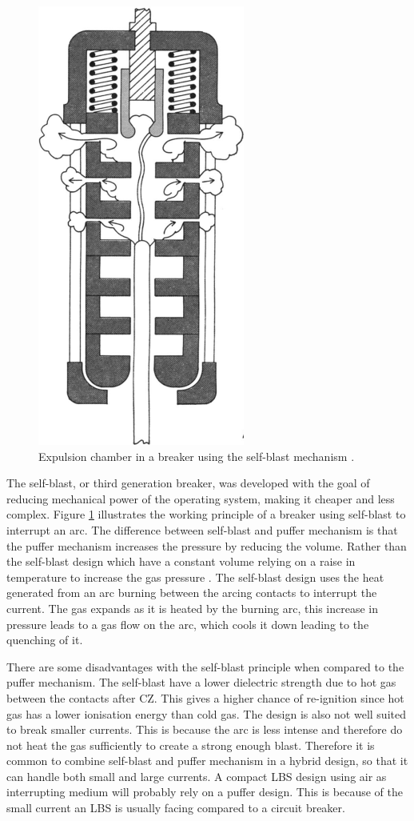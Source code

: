 \documentclass[10pt,a4paper,twoside]{article}
\begin{document}
\begin{figure} [H]
\centering
\includegraphics[scale=0.5]{Bilder/Theory/selfBlast.png}
\caption{Expulsion chamber in a breaker using the self-blast mechanism \cite{bib:CBAC}.} \label{fig:selfBlast}
\end{figure}

The self-blast, or third generation breaker, was developed with the goal of reducing mechanical power of the operating system, making it cheaper and less complex. Figure \ref{fig:selfBlast} illustrates the working principle of a breaker using self-blast to interrupt an arc. The difference between self-blast and puffer mechanism is that the puffer mechanism increases the pressure by reducing the volume. Rather than the self-blast design which have a constant volume relying on a raise in temperature to increase the gas pressure \cite{bib:CBAC}. The self-blast design uses the heat generated from an arc burning between the arcing contacts to interrupt the current. The gas expands as it is heated by the burning arc, this increase in pressure leads to a gas flow on the arc, which cools it down leading to the quenching of it.

There are some disadvantages with the self-blast principle when compared to the puffer mechanism. The self-blast have a lower dielectric strength due to hot gas between the contacts after CZ. This gives a higher chance of re-ignition since hot gas has a lower ionisation energy than cold gas. The design is also not well suited to break smaller currents. This is because the arc is less intense and therefore do not heat the gas sufficiently to create a strong enough blast. Therefore it is common to combine self-blast and puffer mechanism in a hybrid design, so that it can handle both small and large currents. A compact LBS design using air as interrupting medium will probably rely on a puffer design. This is because of the small current an LBS is usually facing compared to a circuit breaker.
\end{document}
